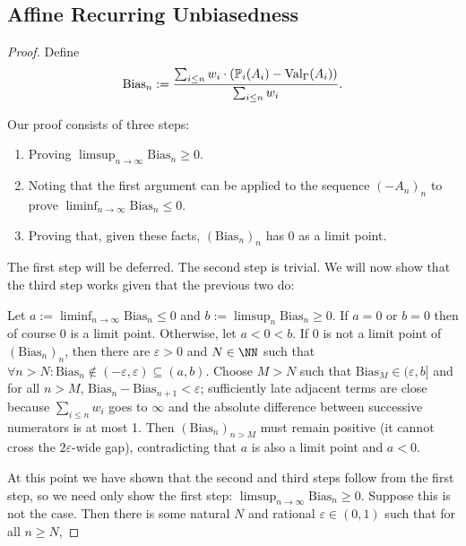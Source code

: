 \documentclass[authordate,onecolumn,noenvironments]{miri-tech-article}
\numberwithin{equation}{subsection}
\newcommand{\nn}{n}
\newcommand{\fuz}{w}
\newcommand{\aff}{A}
\newcommand{\BelState}{\mathbb{P}}
\newcommand{\pt}{\BelState}
\newcommand{\Theory}{\Gamma}
\newcommand{\thmval}[1][\Theory]{\operatorname{Val}_{#1}\-} %
\begin{document}
\subsection{Affine Recurring Unbiasedness}\label{app:recunbiasedaff}

\recunbiasedaff*

\begin{proof}

  Define 
  \[ \mathrm{Bias}_n := 
      \frac
        {\sum_{i\leq \nn}\fuz_i  \cdot(\pt_i(\aff_i)-\thmval(\aff_i))}
        {\sum_{i\leq \nn}\fuz_i} .
      \]

  Our proof consists of three steps:
  \begin{enumerate}
    \item Proving $\limsup_{n \to \infty} \mathrm{Bias}_n \geq 0$.
    \item Noting that the first argument can be applied to the sequence $(-\aff_n)_n$ to prove $\liminf_{n \to \infty} \mathrm{Bias}_n \leq 0$.
    \item Proving that, given these facts, $(\mathrm{Bias}_n)_n$ has 0 as a limit point.
  \end{enumerate}
  The first step will be deferred.  The second step is trivial.  We will now show that the third step works given that the previous two do:

  Let $a := \liminf_{n \to \infty} \mathrm{Bias}_\nn \leq 0$ and $b := \limsup_\nn \mathrm{Bias}_n \geq 0$.  If $a = 0$ or $b = 0$ then of course
  0 is a limit point.  Otherwise, let $a < 0 < b$.  If 0 is not a limit point of $(\mathrm{Bias}_n)_n$, then there are $\varepsilon > 0$ and 
  $N \in\NN$ such that $\forall n> N : \mathrm{Bias}_\nn \notin (-\varepsilon,\varepsilon) \subseteq (a,b)$.
  Choose $M>N$ such that $\mathrm{Bias}_M \in (\varepsilon, b]$ and for all $n>M$, $\mathrm{Bias}_n-\mathrm{Bias}_{n+1}<\varepsilon$; sufficiently late adjacent terms are close because $\sum_{i \leq \nn} \fuz_i$ goes to $\infty$ and the absolute difference between successive numerators is at most 1.
  Then $(\mathrm{Bias}_n)_{n>M}$ must remain positive (it cannot cross the $2\varepsilon$-wide gap), contradicting that $a$ is also a limit point and $a < 0$.

  At this point we have shown that the second and third steps follow from the first step, so we need only show the first step: $\limsup_{n \to \infty} \mathrm{Bias}_n \geq 0$.  Suppose this is not the case.  
  Then there is some natural $N$ and rational $\varepsilon \in (0, 1)$ such that for all $\nn \geq N$,
  

\end{proof}
\end{document}
